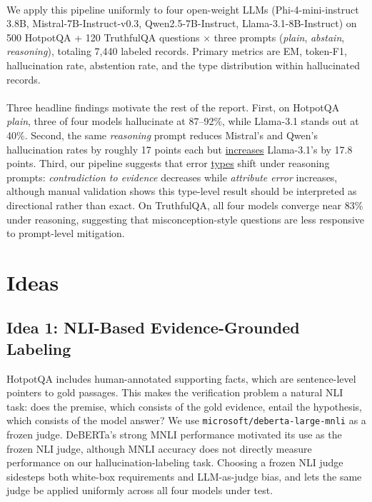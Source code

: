 \documentclass[11pt,a4paper]{article}
\renewcommand{\emph}[1]{\uline{#1}}
\newcommand{\lbl}[1]{\textit{#1}}
\begin{document}
\paragraph{} We apply this pipeline uniformly to four open-weight LLMs (Phi-4-mini-instruct 3.8B, Mistral-7B-Instruct-v0.3, Qwen2.5-7B-Instruct, Llama-3.1-8B-Instruct) on 500 HotpotQA + 120 TruthfulQA questions $\times$ three prompts (\lbl{plain}, \lbl{abstain}, \lbl{reasoning}), totaling 7{,}440 labeled records. Primary metrics are EM, token-F1, hallucination rate, abstention rate, and the type distribution within hallucinated records.

\paragraph{} Three headline findings motivate the rest of the report. First, on HotpotQA \lbl{plain}, three of four models hallucinate at 87--92\%, while Llama-3.1 stands out at 40\%. Second, the same \lbl{reasoning} prompt reduces Mistral's and Qwen's hallucination rates by roughly 17 points each but \emph{increases} Llama-3.1's by 17.8 points. Third, our pipeline suggests that error \emph{types} shift under reasoning prompts: \lbl{contradiction to evidence} decreases while \lbl{attribute error} increases, although manual validation shows this type-level result should be interpreted as directional rather than exact. On TruthfulQA, all four models converge near 83\% under reasoning, suggesting that misconception-style questions are less responsive to prompt-level mitigation.

\section{Ideas}

\subsection{Idea 1: NLI-Based Evidence-Grounded Labeling}

HotpotQA includes human-annotated supporting facts, which are sentence-level pointers to gold passages. This makes the verification problem a natural NLI task: does the premise, which consists of the gold evidence, entail the hypothesis, which consists of the model answer? We use \texttt{microsoft/deberta-large-mnli} as a frozen judge. DeBERTa's strong MNLI performance motivated its use as the frozen NLI judge, although MNLI accuracy does not directly measure performance on our hallucination-labeling task. Choosing a frozen NLI judge sidesteps both white-box requirements and LLM-as-judge bias, and lets the same judge be applied uniformly across all four models under test.
\end{document}
